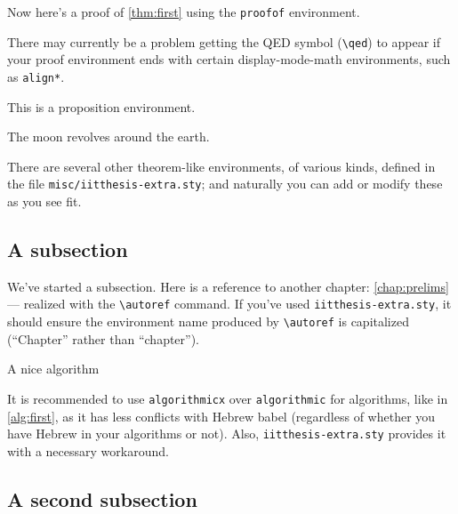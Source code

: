 Now here's a proof of \autoref{thm:first} using the \verb|proofof| environment.
\begin{proofof}
\lipsum[3]
\end{proofof}

\begin{note}There may currently be a problem getting the QED symbol (\verb|\qed|) to appear if your proof environment ends with certain display-mode-math environments, such as \verb|align*|.
\end{note}

\begin{proposition}
\label{prop:first}
This is a proposition environment. 
\end{proposition}

\begin{observation}
\label{obs:first}
The moon revolves around the earth.
\end{observation}

There are several other theorem-like environments, of various kinds, defined in the file \texttt{misc/iitthesis-extra.sty}; and naturally you can add or modify these as you see fit.

\subsection{A subsection}

We've started a subsection. Here is a reference to another chapter: \autoref{chap:prelims} --- realized with the \verb|\autoref| command. If you've used \texttt{iitthesis-extra.sty}, it should ensure the environment name produced by \verb|\autoref| is capitalized (``Chapter'' rather than ``chapter'').

\begin{algorithm}
\caption{A nice algorithm}
\label{alg:first}
\begin{algorithmic}[1]
\ENDFOR
{}
\end{algorithmic}
\end{algorithm}

It is recommended to use \texttt{algorithmicx} over \texttt{algorithmic} for algorithms, like in \autoref{alg:first}, as it has less conflicts with Hebrew babel (regardless of whether you have Hebrew in your algorithms or not). Also, \texttt{iitthesis-extra.sty} provides it with a necessary workaround.

\subsection{A second subsection}

